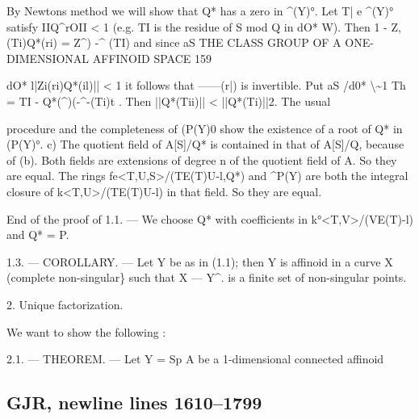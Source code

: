 \documentclass[
  10pt,
]{article}
\newenvironment{Shaded}{}{}
\newcommand{\NormalTok}[1]{#1}
\begin{document}
\begin{Shaded}
\begin{Highlighting}[]
\NormalTok{    By Newton\textquotesingle{}s method we will show that Q* has a zero in \^{}(Y)°. Let}
\NormalTok{T| e \^{}(Y)° satisfy IIQ\^{}rOII \textless{} 1 (e.g. TI is the residue of S mod Q in}
\NormalTok{                                                dO*}
\NormalTok{W).         Then       1 {-} Z,(Ti)Q*(ri) = Z\^{}) {-}\^{} (TI)       and  since}
\NormalTok{                                                 aS}
\NormalTok{        THE CLASS GROUP OF A ONE{-}DIMENSIONAL AFFINOID SPACE                    159}


\NormalTok{                                               dO*}
\NormalTok{l|Zi(ri)Q*(il)|| \textless{} 1   it   follows    that    ——(r|)      is   invertible.   Put}
\NormalTok{                                               aS}
\NormalTok{               /d0*   \textbackslash{}\textasciitilde{}1}
\NormalTok{Th = TI {-} Q*(\^{})({-}\^{}{-}(Ti)t . Then ||Q*(Tii)|| \textless{} ||Q*(Ti)||2. The usual}

\NormalTok{procedure and the completeness of (P(Y)0 show the existence of a root of Q*}
\NormalTok{in (P(Y)°.}
\NormalTok{    c) The quotient field of A[S]/Q* is contained in that of A[S]/Q,}
\NormalTok{because of (b). Both fields are extensions of degree n of the quotient field}
\NormalTok{of A. So they are equal. The rings fe\textless{}T,U,S\textgreater{}/(TE(T)U{-}l,Q*) and \^{}P(Y)}
\NormalTok{are both the integral closure of k\textless{}T,U\textgreater{}/(TE(T)U{-}l) in that field. So they}
\NormalTok{are equal.}

\NormalTok{  End of the proof of 1.1. — We choose Q* with coefficients in}
\NormalTok{k°\textless{}T,V\textgreater{}/(VE(T){-}l) and Q* = P.}

\NormalTok{   1.3. — COROLLARY. — Let Y be as in (1.1); then Y is affinoid in a curve X}
\NormalTok{(complete non{-}singular\} such that X — Y\^{}. is a finite set of non{-}singular points.}

\NormalTok{                            2. Unique factorization.}

\NormalTok{    We want to show the following :}

\NormalTok{   2.1. — THEOREM. — Let Y = Sp A be a 1{-}dimensional connected affinoid}
\end{Highlighting}
\end{Shaded}

\subsection{GJR, newline lines
1610--1799}\label{gjr-newline-lines-16101799}
\end{document}
